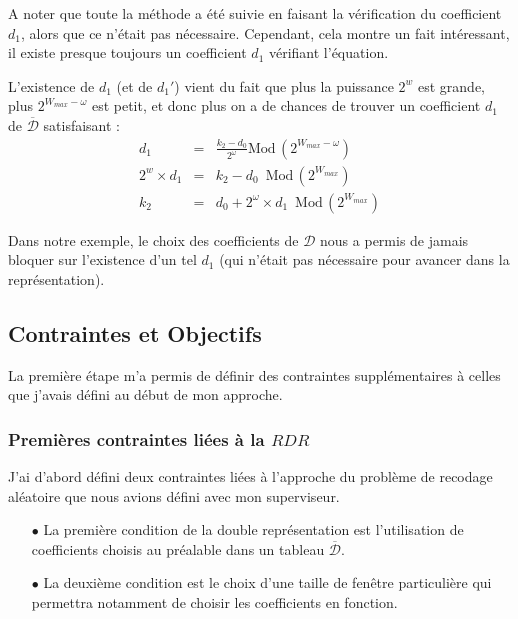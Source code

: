 \documentclass[12pt, a4paper]{memoir}
\newcommand{\dbarre}{\overline{\mathcal{D}}}
\begin{document}
  \begin{Remarque}
   A noter que toute la méthode a été suivie en faisant la vérification du coefficient $d_1$, alors que ce
   n'était pas nécessaire. Cependant, cela montre un fait intéressant, il existe presque toujours un coefficient $d_1$
   vérifiant l'équation. 
   
   L'existence de $d_1$ (et de $d_1'$) vient du fait que plus la puissance $2^w$ est grande,
   plus $2^{W_{max}-\omega}$ est petit, et donc plus on a de chances de trouver un coefficient $d_1$ de $\dbarre$
   satisfaisant :
 $$\begin{array}{ccc}
    d_1 & = & \frac{k_2 - d_0}{2^{\omega}} \text{Mod} \, (2^{W_{max}-\omega}) \\
    2^{w} \times d_1 & = & k_2 - d_0 \,\,\, \text{Mod} \, (2^{W_{max}}) \\
    k_2 & = & d_0 + 2^{\omega} \times d_1 \,\,\, \text{Mod} \, (2^{W_{max}})
 \end{array}$$
   
   Dans notre exemple, le choix des coefficients de $\mathcal{D}$ nous a permis de jamais bloquer sur l'existence d'un
   tel $d_1$ (qui n'était pas nécessaire pour avancer dans la représentation).
  \end{Remarque}
 
 \subsection{Contraintes et Objectifs}
La première étape m'a permis de définir des contraintes supplémentaires à celles que j'avais défini au début de mon approche.

\subsubsection{Premières contraintes liées à la $RDR$}

J'ai d'abord défini deux contraintes liées à l'approche du problème de recodage aléatoire que nous avions défini avec mon superviseur.
\begin{itemize}
 \item [$\bullet$] La première condition de la double représentation est l'utilisation de coefficients choisis au préalable dans un tableau $\overline{\mathcal{D}}$.
 \item [$\bullet$] La deuxième condition est le choix d'une taille de fenêtre particulière qui permettra notamment de choisir les 
 coefficients en fonction.
\end{itemize}
\end{document}
